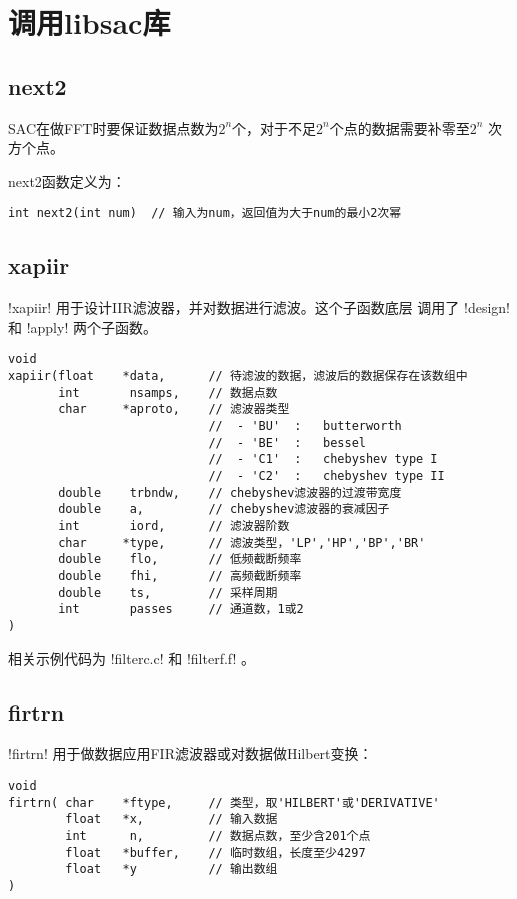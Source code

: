 \section{调用libsac库}
\label{sec:libsac}
\subsection{next2}
SAC在做FFT时要保证数据点数为$2^n$个，对于不足$2^n$个点的数据需要补零至$2^n$
次方个点。

next2函数定义为：
\begin{verbatim}
int next2(int num)  // 输入为num，返回值为大于num的最小2次幂
\end{verbatim}

\subsection{xapiir}
!xapiir! 用于设计IIR滤波器，并对数据进行滤波。这个子函数底层
调用了 !design! 和 !apply! 两个子函数。
\begin{verbatim}
void
xapiir(float    *data,      // 待滤波的数据，滤波后的数据保存在该数组中
       int       nsamps,    // 数据点数
       char     *aproto,    // 滤波器类型
                            //  - 'BU'  :   butterworth
                            //  - 'BE'  :   bessel
                            //  - 'C1'  :   chebyshev type I
                            //  - 'C2'  :   chebyshev type II
       double    trbndw,    // chebyshev滤波器的过渡带宽度
       double    a,         // chebyshev滤波器的衰减因子
       int       iord,      // 滤波器阶数
       char     *type,      // 滤波类型，'LP','HP','BP','BR'
       double    flo,       // 低频截断频率
       double    fhi,       // 高频截断频率
       double    ts,        // 采样周期
       int       passes     // 通道数，1或2
)
\end{verbatim}

相关示例代码为 !filterc.c! 和 !filterf.f! 。

\subsection{firtrn}
!firtrn! 用于做数据应用FIR滤波器或对数据做Hilbert变换：
\begin{verbatim}
void
firtrn( char    *ftype,     // 类型，取'HILBERT'或'DERIVATIVE'
        float   *x,         // 输入数据
        int      n,         // 数据点数，至少含201个点
        float   *buffer,    // 临时数组，长度至少4297
        float   *y          // 输出数组
)
\end{verbatim}

